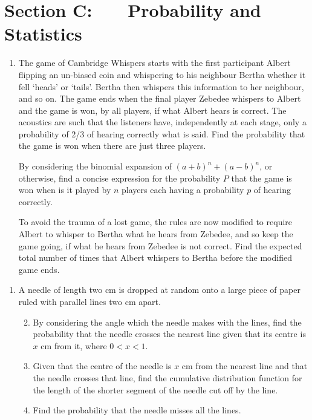 \documentclass[a4, 11pt]{report}
\newlength{\qspace}
\newcounter{qnumber}
\newenvironment{question}%
 {\vspace{\qspace}
  \begin{enumerate}[\bfseries 1\quad][10]%
    \setcounter{enumi}{\value{qnumber}}%
    \item%
 }
{
  \end{enumerate}
  \filbreak
  \stepcounter{qnumber}
 }
\newenvironment{questionparts}[1][1]%
 {
  \begin{enumerate}[\bfseries (i)]%
    \setcounter{enumii}{#1}
    \addtocounter{enumii}{-1}
    \setlength{\itemsep}{5mm}
    \setlength{\parskip}{8pt}
 }
 {
  \end{enumerate}
 }
\begin{document}
	
	\newpage
\section*{Section C: \ \ \ Probability and Statistics}


\begin{question}
The game of Cambridge Whispers starts with the first participant Albert
flipping an
un-biased coin and whispering to his neighbour Bertha
whether it fell `heads' or `tails'. Bertha then whispers this information to
her neighbour, and so on. The game ends when the final player Zebedee whispers
to Albert and the game is won, by all players, if what Albert hears is
correct. The acoustics are such that the listeners have,
independently at each stage, only
a probability of 2/3 of hearing correctly what is said. Find the probability
that the game is won when there are just three players.

By considering the binomial expansion of $(a+b)^n+(a-b)^n$, or otherwise,
find a concise expression for the probability $P$ that the game is won
when is it played by $n$ players each having a probability $p$ of hearing
correctly.

To avoid the trauma of a lost game, the rules are now modified to require
Albert to whisper to Bertha what he
hears from Zebedee, and so keep the game going, if what he hears
from Zebedee is not correct. Find the expected total number of times that
Albert whispers to Bertha before the modified game ends.

\noindent
[You may use without proof the fact that $\sum_1^\infty kx^{k-1}=(1-x)^{-2}$
for $\vert x\vert<1$.]
\end{question}

\begin{question}
A needle of length two cm is dropped at random onto a large piece of paper
ruled with parallel lines two cm apart.

\begin{questionparts}
	\item By considering the angle
which the needle makes with the lines, find the probability that the needle
crosses the nearest line given that its centre is $x$ cm from it, where
$0<x<1$.

\item Given that the centre of the needle is $x$ cm from the nearest
line and that the needle crosses that line, find the cumulative
distribution function for the length of the
shorter segment of the needle cut off by the line.

\item Find the probability that the needle misses all the lines.
\end{questionparts}
\end{question}
\end{document}
